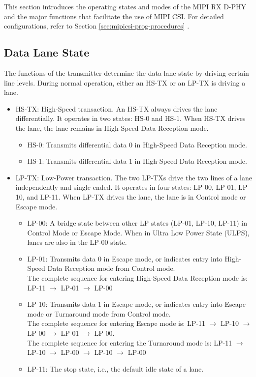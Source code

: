 \documentclass[main\_\_EN.tex]{subfiles}
\begin{document}
This section introduces the operating states and modes of the MIPI RX D-PHY and the major functions that facilitate the use of MIPI CSI. For detailed configurations, refer to Section \ref{sec:mipicsi-prog-procedures} .

\subsection{Data Lane State}

The functions of the transmitter determine the data lane state by driving certain line levels. During normal operation, either an HS-TX or an LP-TX is driving a lane. 

\begin{itemize}
    \item HS-TX: High-Speed transaction. An HS-TX always drives the lane differentially. It operates in two states: HS-0 and HS-1. When HS-TX drives the lane, the lane remains in High-Speed Data Reception mode.
    \begin{itemize}
        \item HS-0: Transmits differential data 0 in High-Speed Data Reception mode.
        \item HS-1: Transmits differential data 1 in High-Speed Data Reception mode.
    \end{itemize}
    \item LP-TX: Low-Power transaction. The two LP-TXs drive the two lines of a lane independently and single-ended. It operates in four states: LP-00, LP-01, LP-10, and LP-11. When LP-TX drives the lane, the lane is in Control mode or Escape mode.
    \begin{itemize}
        \item LP-00: A bridge state between other LP states (LP-01, LP-10, LP-11) in Control Mode or Escape Mode. When in Ultra Low Power State (ULPS), lanes are also in the LP-00 state.
        \item LP-01: Transmits data 0 in Escape mode, or indicates entry into High-Speed Data Reception mode from Control mode.\\
        The complete sequence for entering High-Speed Data Reception mode is: LP-11 $\rightarrow$ LP-01 $\rightarrow$ LP-00
        \item LP-10: Transmits data 1 in Escape mode, or indicates entry into Escape mode or Turnaround mode from Control mode.\\
        The complete sequence for entering Escape mode is: LP-11 $\rightarrow$ LP-10 $\rightarrow$ LP-00 $\rightarrow$ LP-01 $\rightarrow$ LP-00.\\
        The complete sequence for entering the Turnaround mode is: LP-11 $\rightarrow$ LP-10 $\rightarrow$ LP-00 $\rightarrow$ LP-10 $\rightarrow$ LP-00
        \item LP-11: The stop state, i.e., the default idle state of a lane.
    \end{itemize}
\end{itemize}
\end{document}
